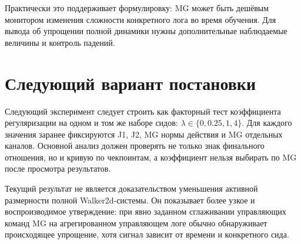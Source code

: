 \documentclass[10pt,a4paper]{article}
\begin{document}
Практически это поддерживает формулировку: MG может быть дешёвым монитором изменения сложности конкретного лога во время обучения. Для вывода об упрощении полной динамики нужны дополнительные наблюдаемые величины и контроль падений.

\section*{Следующий вариант постановки}

Следующий эксперимент следует строить как факторный тест коэффициента регуляризации на одном и том же наборе сидов: $\lambda\in\{0,0.25,1,4\}$. Для каждого значения заранее фиксируются J1, J2, MG нормы действия и MG отдельных каналов. Основной анализ должен проверять не только знак финального отношения, но и кривую по чекпоинтам, а коэффициент нельзя выбирать по MG после просмотра результатов.

Текущий результат не является доказательством уменьшения активной размерности полной Walker2d-системы. Он показывает более узкое и воспроизводимое утверждение: при явно заданном сглаживании управляющих команд MG на агрегированном управляющем логе обычно обнаруживает происходящее упрощение, хотя сигнал зависит от времени и конкретного сида.
\end{document}
